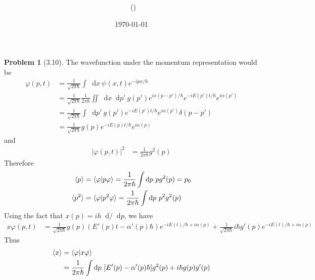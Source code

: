 \documentclass[twoside,11pt]{article}
\title{{\lms \Code \ \Ass}}
\author{\lms \name \ (\href{mailto:\mail}{\mail})}
\date{\sffamily \today}
\makeatletter
\renewcommand*\d{\mathop{}\!\mathrm{d}}
\theoremstyle{definition}
\newtheorem{problem}{Problem}
\theoremstyle{remark}
\newtheorem*{remark}{Remark}
\renewcommand{\maketitle}{\bgroup\setlength{\parindent}{0pt}
\begin{flushleft}
  \textbf{\Large\@title}

  \@author
\end{flushleft}\egroup
}
\makeatother
\begin{document}
\maketitle
\thispagestyle{title}


\begin{problem}[3.10]
    The wavefunction under the momentum representation would be 
    \begin{align*}
        \varphi(p, t) &= \frac{1}{\sqrt{2\pi\hbar}}\int\d x\ \psi(x, t)e^{-ipx/\hbar}\\
        &= \frac{1}{\sqrt{2\pi\hbar}}\frac{1}{2\pi\hbar}
        \iint\d x\d p'\ g(p') e^{ix(p-p')/\hbar}e^{-iE(p')t/\hbar}e^{i\alpha(p')}\\
        &= \frac{1}{\sqrt{2\pi\hbar}}\int\d p'\ g(p')e^{-iE(p')t/\hbar}e^{i\alpha(p')}\delta(p-p')\\
        &= \frac{1}{\sqrt{2\pi\hbar}} g(p)e^{-iE(p)t/\hbar}e^{i\alpha(p)}
    \end{align*}
    and
    \begin{align*}
        |\varphi(p, t)|^2 &= \frac{1}{2\pi\hbar}g^2(p)
    \end{align*}
    Therefore
    \begin{align*}
        \braket{p} &= \braket{\varphi|p \varphi} = \frac{1}{2\pi\hbar}\int\d p\ pg^2(p) = p_0\\
        \braket{p^2} &= \braket{\varphi|p^2\varphi} = \frac{1}{2\pi\hbar}\int\d p\ p^2g^2(p)
    \end{align*}
    Using the fact that $x(p) = ih\d/\d p$, we have
    \begin{align*}
        x\varphi(p, t) &= \frac{1}{\sqrt{2\pi\hbar}} g(p)(E'(p)t - \alpha'(p)\hbar)
        e^{-iE(t)/\hbar + i\alpha(p)} + \frac{1}{\sqrt{2\pi\hbar}}i\hbar g'(p)e^{-iE(t)/\hbar + i\alpha(p)}
    \end{align*}
    Thus
    \begin{align*}
        \braket{x} &= \braket{\varphi|x\varphi} \\
        &= \frac{1}{2\pi\hbar}\int\d p\
        [E'(p)-\alpha'(p)\hbar] g^2(p) + i\hbar g(p)g'(p)\\

\end{align*}
\end{problem}
\end{document}
